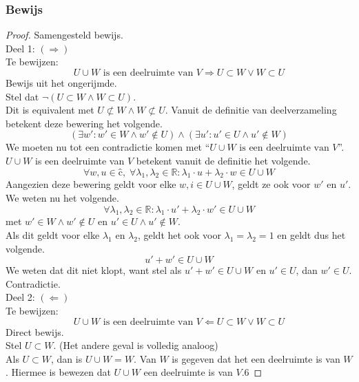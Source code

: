 \documentclass[lineaire_algebra_oplossingen.tex]{subfiles}
\begin{document}
\subsubsection*{Bewijs}
\begin{proof} Samengesteld bewijs.
\\Deel 1: $(\Rightarrow)$
\\ Te bewijzen:
\[
U \cup W \text{ is een deelruimte van }V \Rightarrow U \subset W \vee W \subset U
\]
Bewijs uit het ongerijmde.
\\Stel dat $\neg(U \subset W \wedge W \subset U)$.
\\Dit is equivalent met $U \not\subset W \wedge W \not\subset U$.
Vanuit de definitie van deelverzameling betekent deze bewering het volgende.
\[
(\exists w': w' \in W \wedge w' \not\in U) \wedge (\exists u': u' \in U \wedge u' \not\in W) 
\]
We moeten nu tot een contradictie komen met ``$U\cup W \text{ is een deelruimte van }V$''.
$U\cup W$ is een deelruimte van $V$ betekent vanuit de definitie het volgende.
\[
\forall w, u \in ĉ,\; \forall \lambda_1 , \lambda_2 \in \mathbb{R}: \lambda_1\cdot u + \lambda_2\cdot w \in U\cup W
\]
Aangezien deze bewering geldt voor elke $w,i \in U\cup W$, geldt ze ook voor $w'$ en $u'$.
We weten nu het volgende.
\[
\forall \lambda_1 , \lambda_2 \in \mathbb{R}: \lambda_1\cdot u' + \lambda_2\cdot w' \in U\cup W
\]
met $w' \in W \wedge w' \not\in U$ en $u' \in U \wedge u' \not\in W$.\\
Als dit geldt voor elke $\lambda_1$ en $\lambda_2$, geldt het ook voor $\lambda_1= \lambda_2 = 1$ en geldt dus het volgende.
\[
u' + w' \in U \cup W
\]
We weten dat dit niet klopt, want stel als $u' + w' \in U \cup W$ en $u' \in U$, dan $w' \in U$. Contradictie.
\\Deel 2: $(\Leftarrow)$
\\ Te bewijzen:
\[
U \cup W \text{ is een deelruimte van }V \Leftarrow U \subset W \vee W \subset U
\]
Direct bewijs.\\
Stel $U \subset W$. (Het andere geval is volledig analoog)\\
Als $U \subset W$, dan is $U\cup W = W$. Van $W$ is gegeven dat het een deelruimte is van $W$. Hiermee is bewezen dat $U\cup W$ een deelruimte is van $V$.6
\end{proof}
\end{document}
